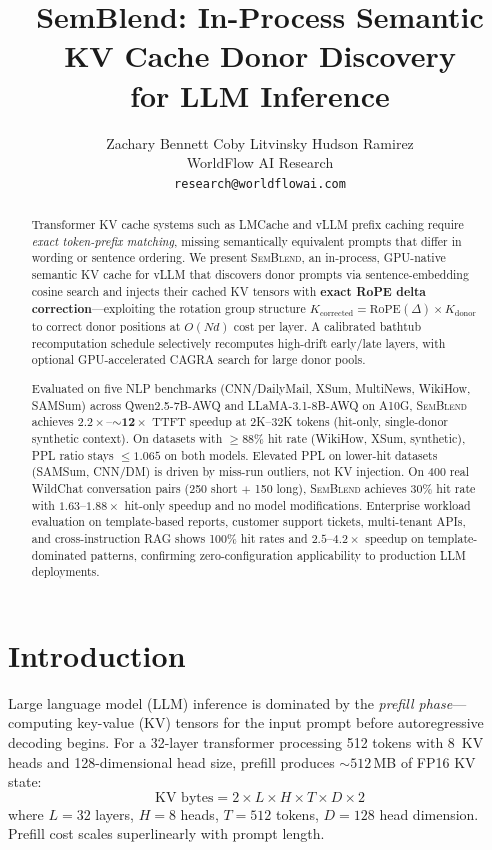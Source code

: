 \documentclass[10pt,twocolumn]{article}
\title{SemBlend: In-Process Semantic KV Cache Donor Discovery\\for LLM Inference}
\author{
  Zachary Bennett \quad Coby Litvinsky \quad Hudson Ramirez\\[4pt]
  WorldFlow AI Research\\
  {\small\texttt{research@worldflowai.com}}
}
\date{}
\newcommand{\semblend}{\textsc{SemBlend}\xspace}
\begin{document}
\maketitle

\begin{abstract}
Transformer KV cache systems such as LMCache and vLLM prefix caching
require \emph{exact token-prefix matching}, missing semantically
equivalent prompts that differ in wording or sentence ordering. We
present \semblend, an in-process, GPU-native semantic KV cache for
vLLM that discovers donor prompts via sentence-embedding cosine search
and injects their cached KV tensors with \textbf{exact RoPE delta
correction}---exploiting the rotation group structure
$K_\text{corrected} = \text{RoPE}(\Delta) \times K_\text{donor}$
to correct donor positions at $O(Nd)$ cost per layer.
A calibrated bathtub recomputation schedule selectively recomputes
high-drift early/late layers, with optional GPU-accelerated CAGRA search
for large donor pools.

Evaluated on five NLP benchmarks (CNN/DailyMail, XSum, MultiNews,
WikiHow, SAMSum) across Qwen2.5-7B-AWQ and LLaMA-3.1-8B-AWQ on A10G,
\semblend achieves $\mathbf{2.2\times}$--$\mathbf{{\sim}12\times}$ TTFT
speedup at 2K--32K tokens (hit-only, single-donor synthetic context). On datasets with ${\geq}88\%$ hit rate
(WikiHow, XSum, synthetic), PPL ratio stays ${\leq}1.065$ on both
models. Elevated PPL on lower-hit datasets (SAMSum, CNN/DM) is driven
by miss-run outliers, not KV injection. On 400 real WildChat conversation pairs (250 short $+$ 150 long),
\semblend achieves 30\% hit rate with $1.63$--$1.88\times$ hit-only
speedup and no model modifications.
Enterprise workload evaluation on template-based reports,
customer support tickets, multi-tenant APIs, and cross-instruction RAG
shows 100\% hit rates and $2.5$--$4.2\times$ speedup on
template-dominated patterns, confirming zero-configuration
applicability to production LLM deployments.
\end{abstract}

\section{Introduction}
\label{sec:intro}

Large language model (LLM) inference is dominated by the
\emph{prefill phase}---computing key-value (KV) tensors for the input
prompt before autoregressive decoding begins. For a 32-layer
transformer processing 512 tokens with 8~KV heads and
128-dimensional head size, prefill produces ${\sim}512$\,MB of FP16 KV
state:
\begin{equation}
  \text{KV bytes} = 2 \times L \times H \times T \times D \times 2
  \label{eq:kv-size}
\end{equation}
where $L{=}32$ layers, $H{=}8$ heads, $T{=}512$ tokens, $D{=}128$ head
dimension. Prefill cost scales superlinearly with prompt length.
\end{document}
